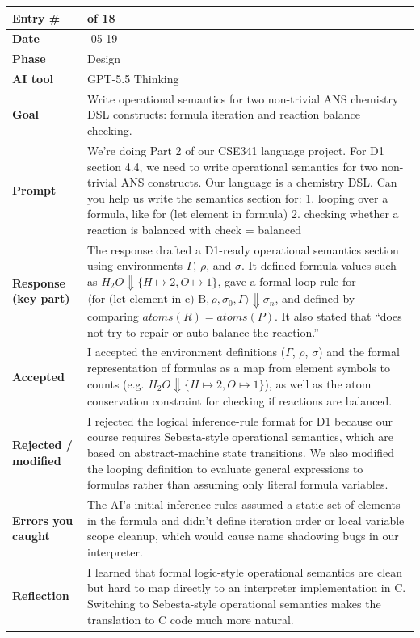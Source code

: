 \documentclass[11pt,a4paper]{article}
\newcommand{\code}[1]{\texttt{\detokenize{#1}}}
\newcommand{\entrygap}{\vspace{8pt}}
\newenvironment{journalentry}{%
  \begin{center}\small\renewcommand{\arraystretch}{1.22}%
  \begin{tabular}{|>{\columncolor{anscodebg}\bfseries}p{3.0cm}|>{\RaggedRight\arraybackslash}p{12.25cm}|}%
  \hline
}{%
  \end{tabular}\end{center}\entrygap
}
\begin{document}
\begin{journalentry}
Entry \# & 13 of 18 \\ \hline
Date & 2026-05-19 \\ \hline
Phase & Design \\ \hline
AI tool & GPT-5.5 Thinking \\ \hline
Goal & Write operational semantics for two non-trivial ANS chemistry DSL constructs: formula iteration and reaction balance checking. \\ \hline
Prompt & We're doing Part 2 of our CSE341 language project. For D1 section 4.4, we need to write operational semantics for two non-trivial ANS constructs. Our language is a chemistry DSL. Can you help us write the semantics section for: 1. looping over a formula, like for (let element in formula) 2. checking whether a reaction is balanced with check = balanced \\ \hline
Response (key part) & The response drafted a D1-ready operational semantics section using environments \(\Gamma\), \(\rho\), and \(\sigma\). It defined formula values such as \(H_2O \Downarrow \{ H \mapsto 2, O \mapsto 1 \}\), gave a formal loop rule for \(\langle \text{for (let element in e) B}, \rho, \sigma_0, \Gamma \rangle \Downarrow \sigma_n\), and defined \code{check = balanced} by comparing \(atoms(R) = atoms(P)\). It also stated that \code{check = balanced} ``does not try to repair or auto-balance the reaction.'' \\ \hline
Accepted & I accepted the environment definitions (\(\Gamma\), \(\rho\), \(\sigma\)) and the formal representation of formulas as a map from element symbols to counts (e.g. \(H_2O \Downarrow \{H \mapsto 2, O \mapsto 1\}\)), as well as the atom conservation constraint for checking if reactions are balanced. \\ \hline
Rejected / modified & I rejected the logical inference-rule format for D1 because our course requires Sebesta-style operational semantics, which are based on abstract-machine state transitions. We also modified the looping definition to evaluate general expressions to formulas rather than assuming only literal formula variables. \\ \hline
Errors you caught & The AI's initial inference rules assumed a static set of elements in the formula and didn't define iteration order or local variable scope cleanup, which would cause name shadowing bugs in our interpreter. \\ \hline
Reflection & I learned that formal logic-style operational semantics are clean but hard to map directly to an interpreter implementation in C. Switching to Sebesta-style operational semantics makes the translation to C code much more natural. \\ \hline
\end{journalentry}
\end{document}

